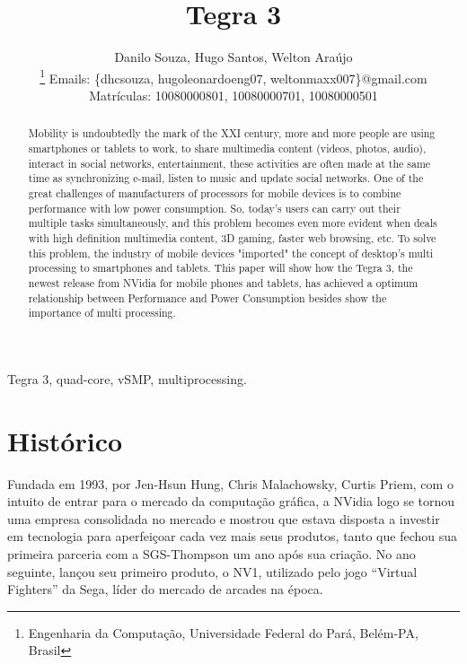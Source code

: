 \documentclass[article]{IEEEtran}
\begin{document}
%

\title{Tegra 3}

\author{Danilo Souza, Hugo Santos, Welton Ara\'ujo

\thanks{Engenharia da Computa\c{c}\~ao, Universidade Federal do Par\'a, Bel\'em-PA, Brasil}
Emails: \{dhcsouza, hugoleonardoeng07, weltonmaxx007\}@gmail.com\\
Matr\'iculas: 10080000801, 10080000701, 10080000501}

\maketitle

\begin{abstract}

Mobility is undoubtedly the mark of the XXI century, more and more people are using smartphones or tablets to work, to share multimedia content (videos, photos, audio), interact in social networks, entertainment, these activities are often made at the same time as synchronizing e-mail, listen to music and update social networks. One of the great challenges of manufacturers of processors for mobile devices is to combine performance with low power consumption. So, today's users can carry out their multiple tasks simultaneously, and this problem becomes even more evident when deals with high definition multimedia content, 3D gaming, faster web browsing, etc. To solve this problem, the industry of mobile devices "imported" the concept of desktop's multi processing to smartphones and tablets. This paper will show how the Tegra 3, the newest release from NVidia for mobile phones and tablets, has achieved a optimum relationship between Performance and Power Consumption besides show the importance of multi processing.

\end{abstract}

\begin{IEEEkeywords}
Tegra 3, quad-core, vSMP, multiprocessing.
\end{IEEEkeywords}

\IEEEpeerreviewmaketitle

\section{Hist\'orico}

Fundada em 1993, por Jen-Hsun Hung, Chris Malachowsky, Curtis Priem,  com o intuito de entrar para o mercado da computa\c{c}\~ao gr\'afica, a NVidia logo se tornou uma empresa consolidada no mercado e mostrou que estava disposta a investir em tecnologia para aperfei\c{c}oar cada vez mais seus produtos, tanto que fechou sua primeira parceria com a SGS-Thompson um ano ap\'os sua cria\c{c}\~ao. No ano seguinte, lan\c{c}ou seu primeiro produto, o NV1, utilizado pelo jogo “Virtual Fighters” da Sega, l\'ider do mercado de arcades na \'epoca.
\end{document}
